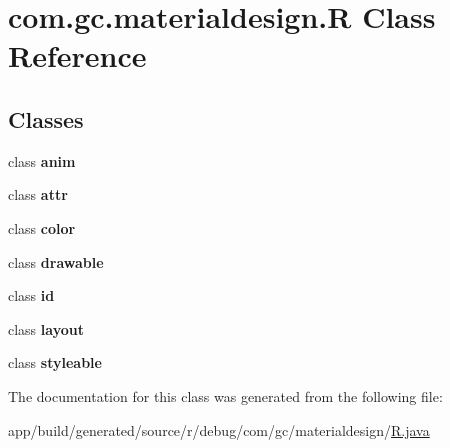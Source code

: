 \hypertarget{classcom_1_1gc_1_1materialdesign_1_1_r}{}\section{com.\+gc.\+materialdesign.\+R Class Reference}
\label{classcom_1_1gc_1_1materialdesign_1_1_r}
\subsection*{Classes}
\begin{DoxyCompactItemize}
\item 
class {\bfseries anim}
\item 
class {\bfseries attr}
\item 
class {\bfseries color}
\item 
class {\bfseries drawable}
\item 
class {\bfseries id}
\item 
class {\bfseries layout}
\item 
class {\bfseries styleable}
\end{DoxyCompactItemize}


The documentation for this class was generated from the following file\+:\begin{DoxyCompactItemize}
\item 
app/build/generated/source/r/debug/com/gc/materialdesign/\hyperlink{app_2build_2generated_2source_2r_2debug_2com_2gc_2materialdesign_2_r_8java}{R.\+java}\end{DoxyCompactItemize}
